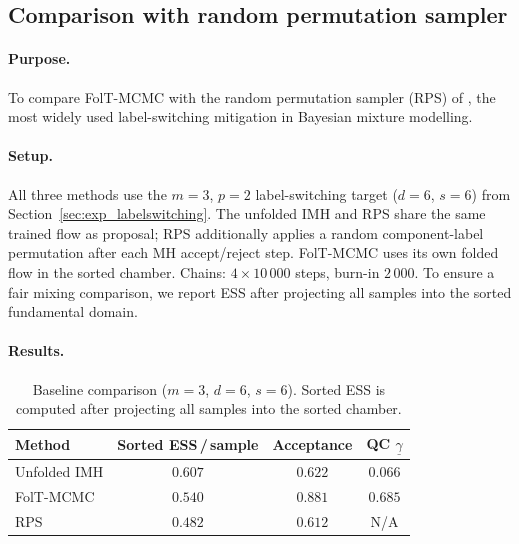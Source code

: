 
\subsection{Comparison with random permutation sampler}
\label{sec:exp_baseline}

\paragraph{Purpose.}
To compare FolT-MCMC with the random permutation sampler
(RPS) of \citet{FruhwirthSchnatter2001}, the most widely used
label-switching mitigation in Bayesian mixture modelling.

\paragraph{Setup.}
All three methods use the $m = 3$, $p = 2$ label-switching target
($d = 6$, $s = 6$) from Section~\ref{sec:exp_labelswitching}.
The unfolded IMH and RPS share the same trained flow as proposal;
RPS additionally applies a random component-label permutation
after each MH accept/reject step.
FolT-MCMC uses its own folded flow in the sorted chamber.
Chains: $4 \times 10\,000$ steps, burn-in $2\,000$.
To ensure a fair mixing comparison, we report ESS after projecting
all samples into the sorted fundamental domain.

\paragraph{Results.}

\begin{table}[t]
\centering
\caption{Baseline comparison ($m = 3$, $d = 6$, $s = 6$).
  Sorted ESS is computed after projecting all samples into the
  sorted chamber.}
\label{tab:baseline}
\smallskip
\begin{tabular}{lccc}
\hline
Method & Sorted ESS\,/\,sample & Acceptance
       & QC $\underline{\gamma}$ \\
\hline
Unfolded IMH & $0.607$ & $0.622$ & $0.066$ \\
FolT-MCMC    & $0.540$ & $0.881$ & $0.685$ \\
RPS          & $0.482$ & $0.612$ & N/A \\
\hline
\end{tabular}
\end{table}

